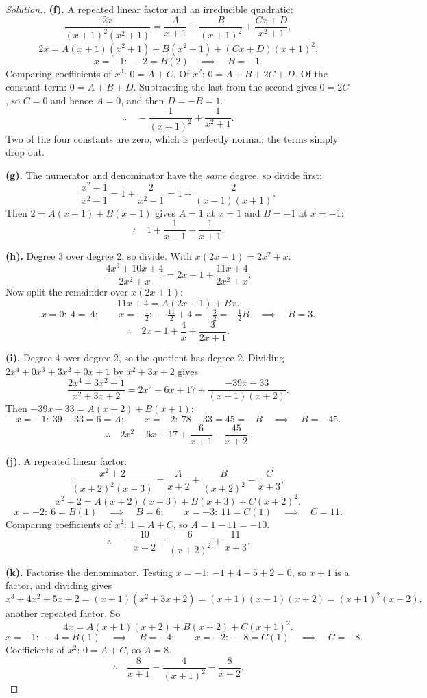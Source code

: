 \documentclass[11pt,a4paper]{article}
\theoremstyle{definition}
\newenvironment{solution}
  {\renewcommand{\qedsymbol}{}\begin{proof}[\textit{Solution}.]}
  {\end{proof}}
\begin{document}
\begin{solution}
\textbf{(f).} A repeated linear factor and an irreducible quadratic:
$$\frac{2x}{(x+1)^2\left(x^2+1\right)}=\frac{A}{x+1}+\frac{B}{(x+1)^2}
+\frac{Cx+D}{x^2+1},$$
$$2x=A(x+1)\left(x^2+1\right)+B\left(x^2+1\right)+(Cx+D)(x+1)^2.$$
$$x=-1:\ -2=B(2)\quad\implies\quad B=-1.$$
Comparing coefficients of $x^3$: $0=A+C$. Of $x^2$: $0=A+B+2C+D$. Of the constant term:
$0=A+B+D$. Subtracting the last from the second gives $0=2C$, so $C=0$ and hence
$A=0$, and then $D=-B=1$.
$$\therefore\quad -\frac{1}{(x+1)^2}+\frac{1}{x^2+1}.$$
Two of the four constants are zero, which is perfectly normal; the terms simply drop
out.

\textbf{(g).} The numerator and denominator have the \emph{same} degree, so divide
first:
$$\frac{x^2+1}{x^2-1}=1+\frac{2}{x^2-1}=1+\frac{2}{(x-1)(x+1)}.$$
Then $2=A(x+1)+B(x-1)$ gives $A=1$ at $x=1$ and $B=-1$ at $x=-1$:
$$\therefore\quad 1+\frac{1}{x-1}-\frac{1}{x+1}.$$

\textbf{(h).} Degree $3$ over degree $2$, so divide. With $x(2x+1)=2x^2+x$:
$$\frac{4x^3+10x+4}{2x^2+x}=2x-1+\frac{11x+4}{2x^2+x}.$$
Now split the remainder over $x(2x+1)$:
$$11x+4=A(2x+1)+Bx.$$
$$x=0:\ 4=A;\qquad x=-\tfrac{1}{2}:\ -\tfrac{11}{2}+4=-\tfrac{3}{2}=-\tfrac{1}{2}B
\quad\implies\quad B=3.$$
$$\therefore\quad 2x-1+\frac{4}{x}+\frac{3}{2x+1}.$$

\textbf{(i).} Degree $4$ over degree $2$, so the quotient has degree $2$. Dividing
$2x^4+0x^3+3x^2+0x+1$ by $x^2+3x+2$ gives
$$\frac{2x^4+3x^2+1}{x^2+3x+2}=2x^2-6x+17+\frac{-39x-33}{(x+1)(x+2)}.$$
Then $-39x-33=A(x+2)+B(x+1)$:
$$x=-1:\ 39-33=6=A;\qquad x=-2:\ 78-33=45=-B\quad\implies\quad B=-45.$$
$$\therefore\quad 2x^2-6x+17+\frac{6}{x+1}-\frac{45}{x+2}.$$

\textbf{(j).} A repeated linear factor:
$$\frac{x^2+2}{(x+2)^2(x+3)}=\frac{A}{x+2}+\frac{B}{(x+2)^2}+\frac{C}{x+3},$$
$$x^2+2=A(x+2)(x+3)+B(x+3)+C(x+2)^2.$$
$$x=-2:\ 6=B(1)\quad\implies\quad B=6;\qquad x=-3:\ 11=C(1)\quad\implies\quad C=11.$$
Comparing coefficients of $x^2$: $1=A+C$, so $A=1-11=-10$.
$$\therefore\quad -\frac{10}{x+2}+\frac{6}{(x+2)^2}+\frac{11}{x+3}.$$

\textbf{(k).} Factorise the denominator. Testing $x=-1$: $-1+4-5+2=0$, so $x+1$ is a
factor, and dividing gives
$$x^3+4x^2+5x+2=(x+1)\left(x^2+3x+2\right)=(x+1)(x+1)(x+2)=(x+1)^2(x+2),$$
another repeated factor. So
$$4x=A(x+1)(x+2)+B(x+2)+C(x+1)^2.$$
$$x=-1:\ -4=B(1)\quad\implies\quad B=-4;\qquad
x=-2:\ -8=C(1)\quad\implies\quad C=-8.$$
Coefficients of $x^2$: $0=A+C$, so $A=8$.
$$\therefore\quad \frac{8}{x+1}-\frac{4}{(x+1)^2}-\frac{8}{x+2}.$$


\end{solution}
\end{document}
